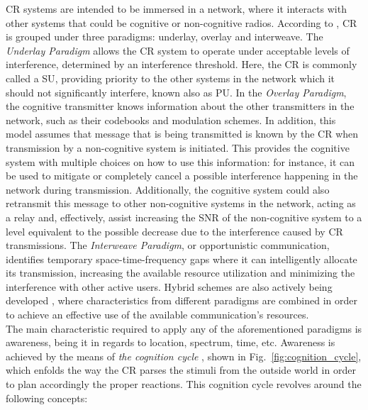 \ac{CR} systems are intended to be immersed in a network, where it interacts with other systems that could be cognitive or non-cognitive radios. According to \cite{Goldsmith}, \ac{CR} is grouped under three paradigms: underlay, overlay and interweave. The \emph{Underlay Paradigm} allows the \ac{CR} system to operate under acceptable levels of interference, determined by an interference threshold. Here, the \ac{CR} is commonly called a \ac{SU}, providing priority to the other systems in the network which it should not significantly interfere, known also as \ac{PU}. In the \emph{Overlay Paradigm}, the cognitive transmitter knows information about the other transmitters in the network, such as their codebooks and modulation schemes. In addition, this model assumes that message that is being transmitted is known by the \ac{CR} when transmission by a non-cognitive system is initiated. This provides the cognitive system with multiple choices on how to use this information: for instance, it can be used to mitigate or completely cancel a possible interference happening in the network during transmission. Additionally, the cognitive system could also retransmit this message to other non-cognitive systems in the network, acting as a relay and, effectively, assist increasing the \ac{SNR} of the non-cognitive system to a level equivalent to the possible decrease due to the interference caused by \ac{CR} transmissions. The \emph{Interweave Paradigm}, or opportunistic communication, identifies temporary space-time-frequency gaps where it can intelligently allocate its transmission, increasing the available resource utilization and minimizing the interference with other active users. Hybrid schemes are also actively being developed \cite{Wu2007} \cite{Kaushik2015} \cite{Wunsch2017a}, where characteristics from different paradigms are combined in order to achieve an effective use of the available communication's resources.\\

The main characteristic required to apply any of the aforementioned paradigms is awareness, being it in regards to location, spectrum, time, etc. Awareness is achieved by the means of \emph{the cognition cycle} \cite{Mitola1999}, shown in Fig.~\ref{fig:cognition_cycle}, which enfolds the way the \ac{CR} parses the stimuli from the outside world in order to plan accordingly the proper reactions. This cognition cycle revolves around the following concepts:

